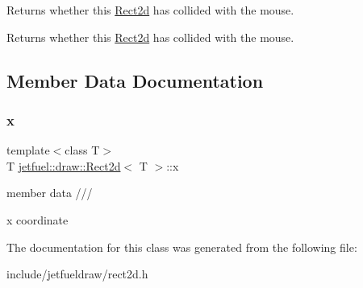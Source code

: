 Returns whether this \hyperlink{classjetfuel_1_1draw_1_1Rect2d}{Rect2d} has collided with the mouse. 

Returns whether this \hyperlink{classjetfuel_1_1draw_1_1Rect2d}{Rect2d} has collided with the mouse. 

\subsection{Member Data Documentation}
\mbox{\label{classjetfuel_1_1draw_1_1Rect2d_ade151e450d1cc5e7b158a28e7bd6d212}} 
\subsubsection{\texorpdfstring{x}{x}}
{\footnotesize\ttfamily template$<$class T$>$ \\
T \hyperlink{classjetfuel_1_1draw_1_1Rect2d}{jetfuel\+::draw\+::\+Rect2d}$<$ T $>$\+::x}



member data /// 

x coordinate 

The documentation for this class was generated from the following file\+:\begin{DoxyCompactItemize}
\item 
include/jetfueldraw/rect2d.\+h\end{DoxyCompactItemize}
